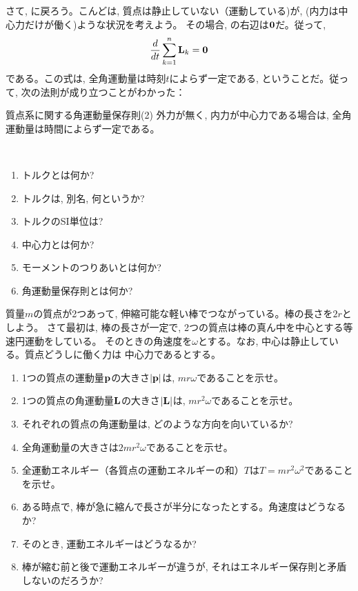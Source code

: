 さて, に戻ろう。こんどは, 質点は静止していない（運動している)が, 
(内力は中心力だけが働く)ような状況を考えよう。
その場合, の右辺は${\bf 0}$だ。従って, 
\begin{eqnarray} 
\frac{d}{dt}\sum_{k=1}^n {\bf L}_k={\bf 0}\label{eq:totangmomtorq3}
\end{eqnarray} 
である。この式は, 全角運動量は時刻$t$によらず一定である, ということだ。従って, 
次の法則が成り立つことがわかった：
\begin{itembox}{質点系に関する角運動量保存則(2)}
外力が無く, 内力が中心力である場合は, 全角運動量は時間によらず一定である。
\end{itembox}


%
\begin{q}\label{q:torque}　
\begin{enumerate}
\item トルクとは何か? 
\item トルクは, 別名, 何というか? 
\item トルクのSI単位は? 
\item 中心力とは何か? 
\item モーメントのつりあいとは何か? 
\item 角運動量保存則とは何か? 
\end{enumerate}
\end{q}
\vspace{0.2cm}

%
\begin{q}\label{q:2points_rotation}
質量$m$の質点が2つあって, 伸縮可能な軽い棒でつながっている。棒の長さを$2r$としよう。
さて最初は, 棒の長さが一定で, 2つの質点は棒の真ん中を中心とする等速円運動をしている。
そのときの角速度を$\omega$とする。なお, 中心は静止している。質点どうしに働く力は
中心力であるとする。
\begin{enumerate}
\item 1つの質点の運動量${\bf p}$の大きさ$|{\bf p}|$は, $mr\omega$であることを示せ。
\item 1つの質点の角運動量${\bf L}$の大きさ$|{\bf L}|$は, $mr^2\omega$であることを示せ。
\item それぞれの質点の角運動量は, どのような方向を向いているか? 
\item 全角運動量の大きさは$2mr^2\omega$であることを示せ。
\item 全運動エネルギー（各質点の運動エネルギーの和）$T$は$T=mr^2\omega^2$であることを示せ。
\item ある時点で, 棒が急に縮んで長さが半分になったとする。角速度はどうなるか? 
\item そのとき, 運動エネルギーはどうなるか? 
\item 棒が縮む前と後で運動エネルギーが違うが, それはエネルギー保存則と矛盾しないのだろうか? 
\end{enumerate}
\end{q}
\hv


